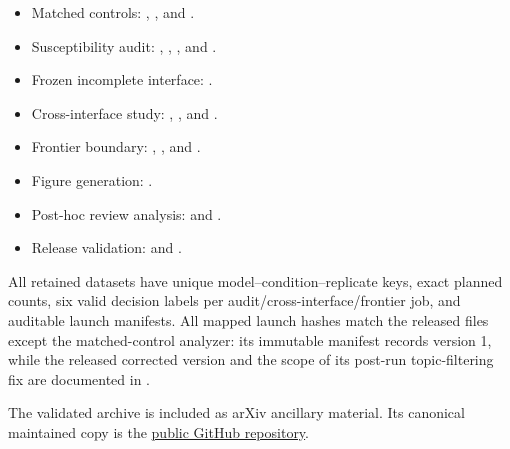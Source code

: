 \documentclass[11pt,letterpaper]{article}
\begin{document}
\begingroup
\small
\raggedright
\begin{itemize}[leftmargin=*]
  \item Matched controls:
        ,
        , and
        .
  \item Susceptibility audit:
        ,
        ,
        , and
        .
  \item Frozen incomplete interface:
        .
  \item Cross-interface study:
        ,
        , and
        .
  \item Frontier boundary:
        ,
        , and
        .
  \item Figure generation:
        .
  \item Post-hoc review analysis:
         and
        .
  \item Release validation:
         and
        .
\end{itemize}
\endgroup

All retained datasets have unique model--condition--replicate keys, exact
planned counts, six valid decision labels per audit/cross-interface/frontier
job, and auditable launch manifests. All mapped launch hashes match the
released files except the matched-control analyzer: its immutable manifest
records version 1, while the released corrected version and the scope of its
post-run topic-filtering fix are documented in
.

The validated archive is included as arXiv ancillary material. Its canonical
maintained copy is the
\href{https://github.com/ranausmanai/recommenders-as-control-surfaces}{public GitHub repository}.
\end{document}
